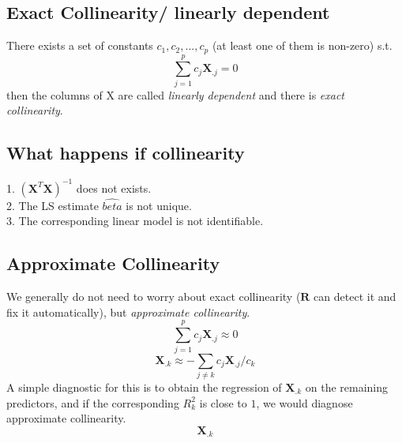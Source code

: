 \documentclass[11pt,a4paper]{article}
\begin{document}
\subsection{Exact Collinearity/ linearly dependent}
There exists a set of constants $c_1,c_2,...,c_p$ (at least one of them is non-zero) s.t.
$$\sum_{j=1}^pc_j \mathbf{X}_{.j}=0$$
then the columns of X are called \textit{linearly dependent} and there is \textit{exact collinearity}.

\subsection{What happens if collinearity}
1. $(\mathbf{X}^T \mathbf{X})^{-1}$ does not exists.\\
2. The LS estimate $\hat{beta}$ is not unique.\\
3. The corresponding linear model is not identifiable.

\subsection{Approximate Collinearity}
We generally do not need to worry about exact collinearity ($\mathbf{R}$ can detect it and ﬁx it automatically), but \textit{approximate collinearity}.
$$\sum_{j=1}^pc_j \mathbf{X}_{.j}\approx 0$$
$$\mathbf{X}_{.k}\approx -\sum_{j\neq k}c_j \mathbf{X}_{.j}/c_k$$
A simple diagnostic for this is to obtain the regression of $\mathbf{X}_{.k}$ on the remaining predictors, and if the corresponding $R_k^2$ is close to $1$, we would diagnose approximate collinearity.
$$\mathbf{X}_{.k}$$
\end{document}
